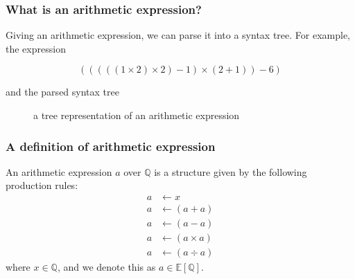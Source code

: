 \documentclass[aspectratio=169]{beamer}
\begin{document}
\begin{frame}
\frametitle{What is an arithmetic expression?}

Giving an arithmetic expression, we can parse it into a syntax tree. For example, the expression

\begin{equation}
(((((1 \times 2) \times 2) - 1) \times (2 + 1)) - 6)\label{eq:equation}
\end{equation}

and the parsed syntax tree

\begin{figure}[ht]
\centering
{}
\caption{a tree representation of an arithmetic expression}\label{fig:syntaxtree}\label{fig:figure}
\end{figure}
\end{frame}

\begin{frame}
\frametitle{A definition of arithmetic expression}
\begin{definition}\label{def:arithmetic-expression}
    An arithmetic expression $a$ over $\mathbb{Q}$ is a structure given by the following production rules:
\begin{equation}\label{eq:productionrule}
\begin{aligned}
a &\longleftarrow x\\
a &\longleftarrow ( a + a )\\
a &\longleftarrow ( a - a )\\
a &\longleftarrow ( a \times a )\\
a &\longleftarrow ( a \div a )
\end{aligned}
\end{equation}
    where $x \in \mathbb{Q}$, and we denote this as $a \in \mathbb{E} \left [\mathbb{Q} \right ]$.
\end{definition}
\end{frame}
\end{document}
